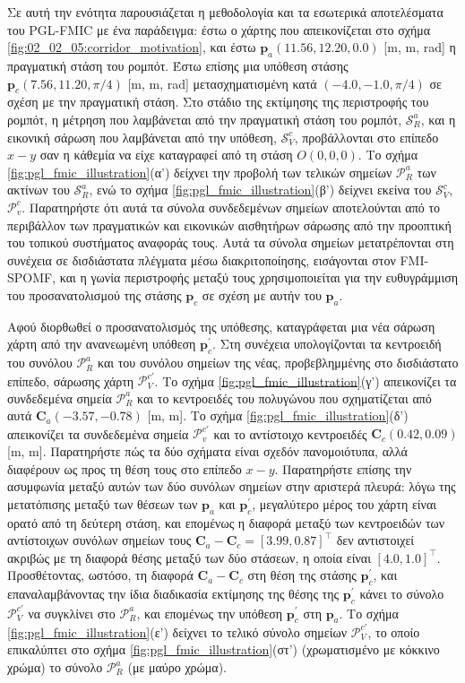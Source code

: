 Σε αυτή την ενότητα παρουσιάζεται η μεθοδολογία και τα εσωτερικά αποτελέσματα
του PGL-FMIC με ένα παράδειγμα: έστω ο χάρτης που απεικονίζεται στο σχήμα
\ref{fig:02_02_05:corridor_motivation}, και έστω $\bm{p}_a(11.56, 12.20, 0.0)$
[m, m, rad] η πραγματική στάση του ρομπότ. Έστω επίσης μια υπόθεση στάσης
$\bm{p}_c (7.56, 11.20, \pi/4)$ [m, m, rad] μετασχηματισμένη κατά $(-4.0, -1.0,
\pi/4)$ σε σχέση με την πραγματική στάση. Στο στάδιο της εκτίμησης της
περιστροφής του ρομπότ, η μέτρηση που λαμβάνεται από την πραγματική στάση του
ρομπότ, $\mathcal{S}_R^a$, και η εικονική σάρωση που λαμβάνεται από την
υπόθεση, $\mathcal{S}_V^c$, προβάλλονται στο επίπεδο $x-y$ σαν η κάθεμία να
είχε καταγραφεί από τη στάση $Ο(0,0,0)$. Το σχήμα
\ref{fig:pgl_fmic_illustration}(α') δείχνει την προβολή των τελικών σημείων
$\mathcal{P}_R^a$ των ακτίνων του $\mathcal{S}_R^a$, ενώ το σχήμα
\ref{fig:pgl_fmic_illustration}(β') δείχνει εκείνα του $\mathcal{S}_V^c$,
$\mathcal{P}_v^c$.  Παρατηρήστε ότι αυτά τα σύνολα συνδεδεμένων σημείων
αποτελούνται από το περιβάλλον των πραγματικών και εικονικών αισθητήρων σάρωσης
από την προοπτική του τοπικού συστήματος αναφοράς τους. Αυτά τα σύνολα σημείων
μετατρέπονται στη συνέχεια σε δισδιάστατα πλέγματα μέσω διακριτοποίησης,
εισάγονται στον FMI-SPOMF, και η γωνία περιστροφής μεταξύ τους
χρησιμοποιείται για την ευθυγράμμιση του προσανατολισμού της στάσης $\bm{p}_c$
σε σχέση με αυτήν του $\bm{p}_a$.

Αφού διορθωθεί ο προσανατολισμός της υπόθεσης, καταγράφεται μια νέα σάρωση
χάρτη από την ανανεωμένη υπόθεση $\bm{p}_c^\prime$. Στη συνέχεια υπολογίζονται
τα κεντροειδή του συνόλου $\mathcal{P}_R^a$ και του συνόλου σημείων της νέας,
προβεβλημμένης στο δισδιάστατο επίπεδο, σάρωσης χάρτη
$\mathcal{P}_V^{c\prime}$. Το σχήμα \ref{fig:pgl_fmic_illustration}(γ')
απεικονίζει τα συνδεδεμένα σημεία $\mathcal{P}_R^a$ και το κεντροειδές του
πολυγώνου που σχηματίζεται από αυτά $\bm{C}_a(-3.57, -0.78)$ [m, m]. Το σχήμα
\ref{fig:pgl_fmic_illustration}(δ') απεικονίζει τα συνδεδεμένα σημεία
$\mathcal{P}_v^{c\prime}$ και το αντίστοιχο κεντροειδές $\bm{C}_c(0.42, 0.09)$
[m, m]. Παρατηρήστε πώς τα δύο σχήματα είναι σχεδόν πανομοιότυπα, αλλά
διαφέρουν ως προς τη θέση τους στο επίπεδο $x-y$.  Παρατηρήστε επίσης την
ασυμφωνία μεταξύ αυτών των δύο συνόλων σημείων στην αριστερά πλευρά: λόγω της
μετατόπισης μεταξύ των θέσεων των $\bm{p}_a$ και $\bm{p}_c^\prime$, μεγαλύτερο
μέρος του χάρτη είναι ορατό από τη δεύτερη στάση, και επομένως η διαφορά μεταξύ
των κεντροειδών των αντίστοιχων συνόλων σημείων τους $\bm{C}_a - \bm{C}_c =
[3.99, 0.87]^\top$ δεν αντιστοιχεί ακριβώς με τη διαφορά θέσης μεταξύ των δύο
στάσεων, η οποία είναι $[4.0, 1.0]^\top$.  Προσθέτοντας, ωστόσο, τη διαφορά
$\bm{C}_a - \bm{C}_c$ στη θέση της στάσης $\bm{p}_c^\prime$, και
επαναλαμβάνοντας την ίδια διαδικασία εκτίμησης της θέσης της $\bm{p}_c^\prime$
κάνει το σύνολο $\mathcal{P}_V^{c\prime}$ να συγκλίνει στο $\mathcal{P}_R^a$,
και επομένως την υπόθεση $\bm{p}_c^{\prime}$ στη $\bm{p}_a$. Το σχήμα
\ref{fig:pgl_fmic_illustration}(ε') δείχνει το τελικό σύνολο σημείων
$\mathcal{P}_V^{c\prime}$, το οποίο επικαλύπτει στο σχήμα
\ref{fig:pgl_fmic_illustration}(στ') (χρωματισμένο με κόκκινο χρώμα) το σύνολο
$\mathcal{P}_R^a$ (με μαύρο χρώμα).


